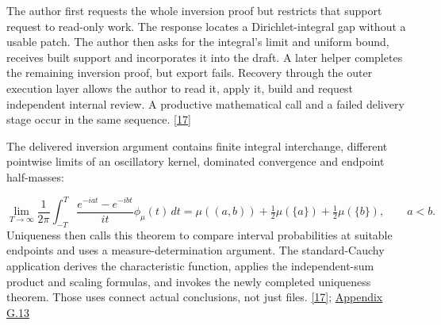 The author first requests the whole inversion proof but restricts that support request to read-only work. The response locates a Dirichlet-integral gap without a usable patch. The author then asks for the integral's limit and uniform bound, receives built support and incorporates it into the draft. A later helper completes the remaining inversion proof, but export fails. Recovery through the outer execution layer allows the author to read it, apply it, build and request independent internal review. A productive mathematical call and a failed delivery stage occur in the same sequence. \href{en.pdf\#ref-17}{\mbox{[17]}}

The delivered inversion argument contains finite integral interchange, different pointwise limits of an oscillatory kernel, dominated convergence and endpoint half-masses:

\[
\lim_{T\to\infty}\frac1{2\pi}\int_{-T}^{T}
\frac{e^{-iat}-e^{-ibt}}{it}\phi_\mu(t)\,dt
=\mu((a,b))+\tfrac12\mu(\{a\})+\tfrac12\mu(\{b\}),\qquad a<b.
\]
Uniqueness then calls this theorem to compare interval probabilities at suitable endpoints and uses a measure-determination argument. The standard-Cauchy application derives the characteristic function, applies the independent-sum product and scaling formulas, and invokes the newly completed uniqueness theorem. Those uses connect actual conclusions, not just files. \href{en.pdf\#ref-17}{\mbox{[17]}}; \href{en-appendix.pdf\#g13}{Appendix G.13}


